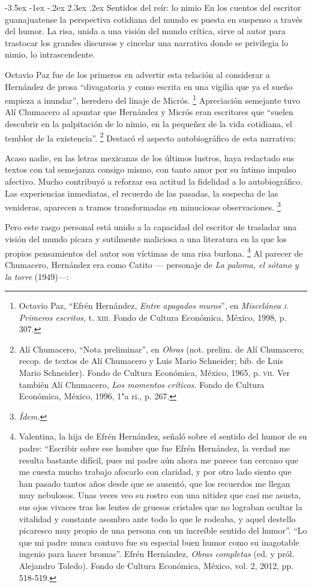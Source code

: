 \documentclass[14pt,twoside,final]{extbook} %
\makeatletter
\let\oldfootnote\footnote
\renewcommand\footnote[1]{%
\oldfootnote{\hspace{1mm}#1}}
\renewcommand\section{\@startsection {section}{1}{\z@}%
                                     {-3.5ex \@plus -1ex \@minus -.2ex}%
                                     {2.3ex \@plus .2ex}%
                                     {\normalfont\large\bfseries\sc}}
\makeatother
\begin{document}
\section{Sentidos del reír: lo nimio}\label{sec:sentidos-del-reir-lo-nimio}
En los cuentos del escritor guanajuatense la perspectiva cotidiana del mundo es puesta en suspenso a través del humor. La risa, unida a una visión del mundo crítica, sirve al autor para trastocar los grandes discursos y cincelar una narrativa donde se privilegia lo nimio, lo intrascendente.

Octavio Paz fue de los primeros en advertir esta relación al considerar a Hernández de prosa ``divagatoria y como escrita en una vigilia que ya el sueño empieza a inundar'', heredero del linaje de Micrós.\footnote{Octavio Paz, ``Efrén Hernández, \emph{Entre apagados muros}'', en \emph{Miscelánea \textsc{i}. Primeros escritos,} t. \textsc{xiii}. Fondo de Cultura Económica, México, 1998, p. 307.} Apreciación semejante tuvo Alí Chumacero al apuntar que Hernández y Micrós eran escritores que ``suelen descubrir en la palpitación de lo nimio, en la pequeñez de la vida cotidiana, el temblor de la existencia''.\footnote{Alí Chumacero, ``Nota preliminar'', en  \emph{Obras} (not. prelim. de Alí Chumacero; recop. de textos de Alí Chumacero y Luis Mario Schneider; bib. de Luis Mario Schneider). Fondo de Cultura Económica, México, 1965, p. \textsc{vii}. Ver también Alí Chumacero, \emph{Los momentos críticos.} Fondo de Cultura Económica, México, 1996, 1"a ri., p. 267.} Destacó el aspecto autobiográfico de esta narrativa:
\begin{quoting}
Acaso nadie, en las letras mexicanas de los últimos lustros, haya redactado sus textos con tal semejanza consigo mismo, con tanto amor por su íntimo impulso afectivo. Mucho contribuyó a reforzar esa actitud la fidelidad a lo autobiográfico. Las experiencias inmediatas, el recuerdo de las pasadas, la sospecha de las venideras, aparecen a tramos transformadas en minuciosas observaciones.\footnote{\em Ídem.}
\end{quoting}
Pero este rasgo personal está unido a la capacidad del escritor de trasladar una visión del mundo pícara y sutilmente maliciosa a una literatura en la que los propios pensamientos del autor son víctimas de una risa burlona.\footnote{Valentina, la hija de Efrén Hernández, señaló sobre el sentido del humor de su padre: ``Escribir sobre ese hombre que fue Efrén Hernández, la verdad me resulta bastante difícil, pues mi padre aún ahora me parece tan cercano que me cuesta mucho trabajo afocarlo con claridad, y por otro lado siento que han pasado tantos años desde que se ausentó, que los recuerdos me llegan muy nebulosos. Unas veces veo su rostro con una nitidez que casi me asusta, sus ojos vivaces tras los lentes de gruesos cristales que no lograban ocultar la vitalidad y constante asombro ante todo lo que le rodeaba, y aquel destello picaresco muy propio de una persona con un increíble sentido del humor''. ``Lo que mi padre nunca contuvo fue su especial buen humor como su inagotable ingenio para hacer bromas''. Efrén Hernández, \emph{Obras completas} (ed. y pról. Alejandro Toledo). Fondo de Cultura Económica, México, vol. 2, 2012, pp. 518-519.} Al parecer de Chumacero, Hernández era como Catito --- personaje de \emph{La paloma, el sótano y la torre} (1949)---:
\end{document}
